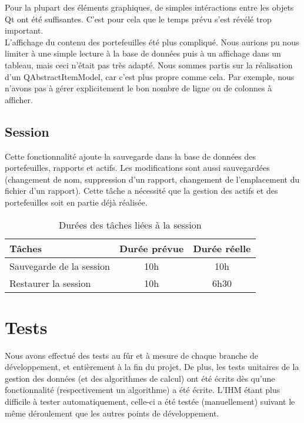 \documentclass[a4paper]{report}
\begin{document}
Pour la plupart des éléments graphiques, de simples intéractions entre les objets Qt ont été suffisantes. C'est pour cela que le temps prévu s'est révélé trop important.\\

L'affichage du contenu des portefeuilles été plus compliqué. Nous aurions pu nous limiter à une simple lecture à la base de données puis à un affichage dans un tableau, mais ceci n'était pas très adapté.  Nous sommes partis sur la réalisation d'un QAbstractItemModel, car c'est plus propre comme cela. Par exemple, nous n'avons pas à gérer explicitement le bon nombre de ligne ou de colonnes à afficher.

\section{Session}
Cette fonctionnalité ajoute la sauvegarde dans la base de données des portefeuilles, rapports et actifs. Les modifications sont aussi sauvegardées (changement de nom, suppression d'un rapport, changement de l'emplacement du fichier d'un rapport). Cette tâche a nécessité que la gestion des actifs et des portefeuilles soit en partie déjà réalisée.


\begin{table}[H]
\centering
  \begin{tabularx}{0.8\textwidth}{| X | c | c |}
    \hline
	Tâches & Durée prévue & Durée réelle \\
    \hline
    Sauvegarde de la session &  10h & 10h\\
    Restaurer la session &  10h & 6h30\\
    \hline
  \end{tabularx}
  \caption{Durées des tâches liées à la session}
\end{table}


\chapter{Tests}

Nous avons effectué des tests au fûr et à mesure de chaque branche de développement, et entièrement à la fin du projet. De plus, les tests unitaires de la gestion des données (et des algorithmes de calcul) ont été écrits dès qu'une fonctionnalité (respectivement un algorithme) a été écrite. L'IHM étant plus difficile à tester automatiquement, celle-ci a été testée (manuellement) suivant le même déroulement que les autres points de développement.
\end{document}
